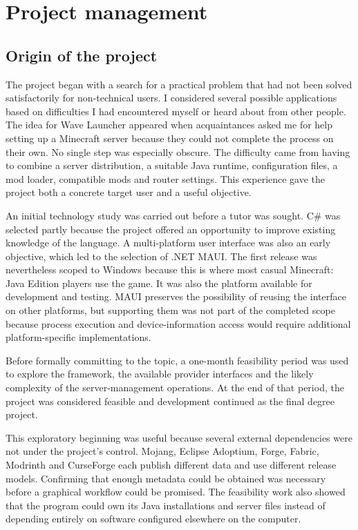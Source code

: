 
\chapter{Project management}\label{chap:management}

\section{Origin of the project}

The project began with a search for a practical problem that had not been solved satisfactorily for non-technical users. I considered several possible applications based on difficulties I had encountered myself or heard about from other people. The idea for Wave Launcher appeared when acquaintances asked me for help setting up a Minecraft server because they could not complete the process on their own. No single step was especially obscure. The difficulty came from having to combine a server distribution, a suitable Java runtime, configuration files, a mod loader, compatible mods and router settings. This experience gave the project both a concrete target user and a useful objective.

An initial technology study was carried out before a tutor was sought. C\# was selected partly because the project offered an opportunity to improve existing knowledge of the language. A multi-platform user interface was also an early objective, which led to the selection of .NET MAUI. The first release was nevertheless scoped to Windows because this is where most casual Minecraft: Java Edition players use the game. It was also the platform available for development and testing. MAUI preserves the possibility of reusing the interface on other platforms, but supporting them was not part of the completed scope because process execution and device-information access would require additional platform-specific implementations.

Before formally committing to the topic, a one-month feasibility period was used to explore the framework, the available provider interfaces and the likely complexity of the server-management operations. At the end of that period, the project was considered feasible and development continued as the final degree project.

This exploratory beginning was useful because several external dependencies were not under the project's control. Mojang, Eclipse Adoptium, Forge, Fabric, Modrinth and CurseForge each publish different data and use different release models. Confirming that enough metadata could be obtained was necessary before a graphical workflow could be promised. The feasibility work also showed that the program could own its Java installations and server files instead of depending entirely on software configured elsewhere on the computer.

